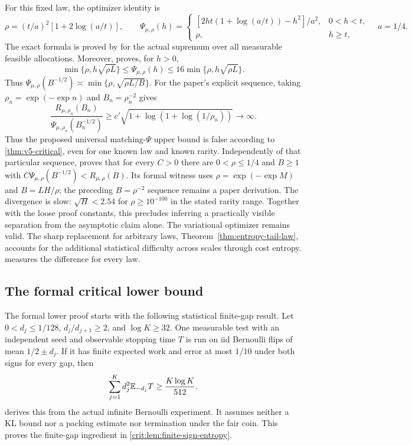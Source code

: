 For this fixed law, the optimizer identity is
\[
 \rho=(t/a)^2[1+2\log(a/t)],\qquad
 \Psi_{\mu,\rho}(h)=
 \begin{cases}
 [2ht(1+\log(a/t))-h^2]/a^2,&0<h<t,\\
 \rho,&h\ge t,
 \end{cases}
 \quad a=1/4.
\]
The exact formula is proved by
 for the actual supremum
over all measurable feasible allocations. Moreover,
 proves, for $h>0$,
\[
 \min\{\rho,h\sqrt{\rho L}\}\le\Psi_{\mu,\rho}(h)
 \le16\min\{\rho,h\sqrt{\rho L}\}.
\]
Thus $\Psi_{\mu,\rho}(B^{-1/2})\asymp\min\{\rho,\sqrt{\rho L/B}\}$.
For the paper's explicit sequence, taking $\rho_n=\exp(-\exp n)$ and $B_n=\rho_n^{-2}$ gives
\[
 \frac{R_{\mu,\rho_n}(B_n)}
      {\Psi_{\mu,\rho_n}(B_n^{-1/2})}
 \ge c'\sqrt{1+\log(1+\log(1/\rho_n))}\longrightarrow\infty.
\]
Thus the proposed universal matching-$\Psi$ upper bound is false
according to \cref{thm:v5-critical}, even for one known law and known
rarity. Independently of that particular sequence,
 proves that
for every $C>0$ there are $0<\rho\le1/4$ and $B\ge1$ with
$C\Psi_{\mu,\rho}(B^{-1/2})<R_{\mu,\rho}(B)$.
Its formal witness uses $\rho=\exp(-\exp M)$ and $B=LH/\rho$;
the preceding $B=\rho^{-2}$ sequence remains a paper derivation.
The divergence is slow: $\sqrt H<2.54$ for $\rho\ge10^{-100}$ in the
stated rarity range. Together with the loose proof constants, this
precludes inferring a practically visible separation from the asymptotic
claim alone.
The variational optimizer remains valid. The sharp replacement for
arbitrary laws, Theorem~\ref{thm:entropy-tail-law}, accounts for the
additional statistical difficulty across scales through cost entropy.
 measures the difference for every law.

\subsection{The formal critical lower bound}
The formal lower proof starts with the following statistical finite-gap result.
Let $0<d_j\le1/128$, $d_j/d_{j+1}\ge2$, and $\log K\ge32$.
One measurable test with an independent seed and observable stopping
time $T$ is run on iid Bernoulli flips of mean $1/2\pm d_j$.
If it has finite expected work and error at most $1/10$ under both
signs for every gap, then
\[
 \sum_{j=1}^K d_j^2\mathbb E_{-d_j}T\ge \frac{K\log K}{512}.
\]
derives this from the actual infinite Bernoulli experiment. It assumes
neither a KL bound nor a packing estimate nor termination under the fair
coin. This proves the finite-gap ingredient in
\cref{crit:lem:finite-sign-entropy}.

